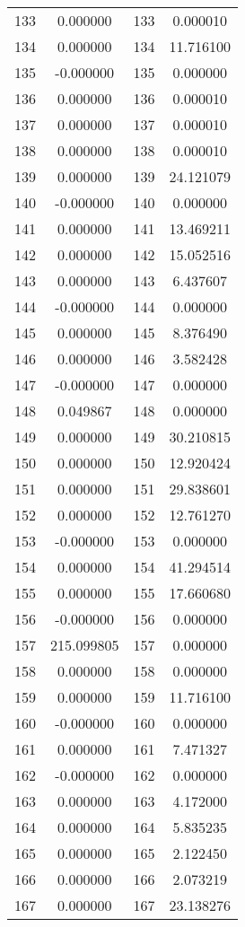 \documentclass[12pt]{article}
\begin{document}
\begin{longtable}{@{}cccc@{}}
133 & 0.000000 & 133 & 0.000010 \\
134 & 0.000000 & 134 & 11.716100 \\
135 & -0.000000 & 135 & 0.000000 \\
136 & 0.000000 & 136 & 0.000010 \\
137 & 0.000000 & 137 & 0.000010 \\
138 & 0.000000 & 138 & 0.000010 \\
139 & 0.000000 & 139 & 24.121079 \\
140 & -0.000000 & 140 & 0.000000 \\
141 & 0.000000 & 141 & 13.469211 \\
142 & 0.000000 & 142 & 15.052516 \\
143 & 0.000000 & 143 & 6.437607 \\
144 & -0.000000 & 144 & 0.000000 \\
145 & 0.000000 & 145 & 8.376490 \\
146 & 0.000000 & 146 & 3.582428 \\
147 & -0.000000 & 147 & 0.000000 \\
148 & 0.049867 & 148 & 0.000000 \\
149 & 0.000000 & 149 & 30.210815 \\
150 & 0.000000 & 150 & 12.920424 \\
151 & 0.000000 & 151 & 29.838601 \\
152 & 0.000000 & 152 & 12.761270 \\
153 & -0.000000 & 153 & 0.000000 \\
154 & 0.000000 & 154 & 41.294514 \\
155 & 0.000000 & 155 & 17.660680 \\
156 & -0.000000 & 156 & 0.000000 \\
157 & 215.099805 & 157 & 0.000000 \\
158 & 0.000000 & 158 & 0.000000 \\
159 & 0.000000 & 159 & 11.716100 \\
160 & -0.000000 & 160 & 0.000000 \\
161 & 0.000000 & 161 & 7.471327 \\
162 & -0.000000 & 162 & 0.000000 \\
163 & 0.000000 & 163 & 4.172000 \\
164 & 0.000000 & 164 & 5.835235 \\
165 & 0.000000 & 165 & 2.122450 \\
166 & 0.000000 & 166 & 2.073219 \\
167 & 0.000000 & 167 & 23.138276 \\

\end{longtable}
\end{document}
